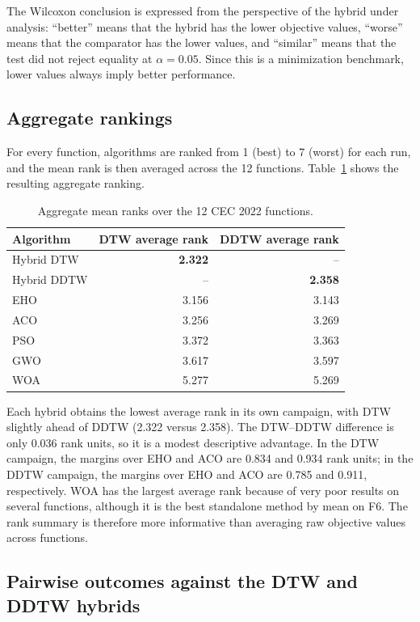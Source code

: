 The Wilcoxon conclusion is expressed from the perspective of the hybrid under
analysis:
``better'' means that the hybrid has the lower objective values, ``worse''
means that the comparator has the lower values, and ``similar'' means that the
test did not reject equality at $\alpha=0.05$. Since this is a minimization
benchmark, lower values always imply better performance.

\subsection{Aggregate rankings}

For every function, algorithms are ranked from 1 (best) to 7 (worst) for each
run, and the mean rank is then averaged across the 12 functions. Table~\ref{tab:cec2022-dtw-ranks}
shows the resulting aggregate ranking.

\begin{table}[htbp]
\centering
\caption{Aggregate mean ranks over the 12 CEC 2022 functions.}
\label{tab:cec2022-dtw-ranks}
\begin{tabular}{lrr}
\toprule
Algorithm & DTW average rank & DDTW average rank\\
\midrule
Hybrid DTW  & \textbf{2.322} & --\\
Hybrid DDTW & -- & \textbf{2.358}\\
EHO         & 3.156 & 3.143\\
ACO         & 3.256 & 3.269\\
PSO         & 3.372 & 3.363\\
GWO         & 3.617 & 3.597\\
WOA         & 5.277 & 5.269\\
\bottomrule
\end{tabular}
\end{table}

Each hybrid obtains the lowest average rank in its own campaign, with DTW
slightly ahead of DDTW (2.322 versus 2.358). The DTW--DDTW difference is only
0.036 rank units, so it is a modest descriptive advantage. In the DTW campaign,
the margins over EHO and ACO are 0.834 and 0.934 rank units; in the DDTW
campaign, the margins over EHO and ACO are 0.785 and 0.911, respectively. WOA
has the largest average rank because of
very poor results on several functions, although it is the best standalone
method by mean on F6. The rank summary is therefore more informative than
averaging raw objective values across functions.

\subsection{Pairwise outcomes against the DTW and DDTW hybrids}

